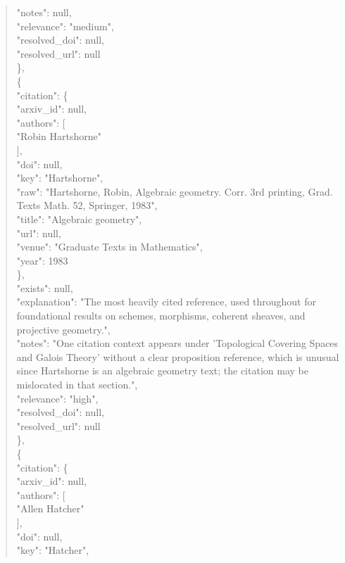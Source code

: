 \documentclass[11pt]{article}
\begin{document}
\begin{quote}
      "notes": null,\\
      "relevance": "medium",\\
      "resolved\_doi": null,\\
      "resolved\_url": null\\
    \},\\
    \{\\
      "citation": \{\\
        "arxiv\_id": null,\\
        "authors": [\\
          "Robin Hartshorne"\\
        ],\\
        "doi": null,\\
        "key": "Hartshorne",\\
        "raw": "Hartshorne, Robin, Algebraic geometry. Corr. 3rd printing, Grad. Texts Math. 52, Springer, 1983",\\
        "title": "Algebraic geometry",\\
        "url": null,\\
        "venue": "Graduate Texts in Mathematics",\\
        "year": 1983\\
      \},\\
      "exists": null,\\
      "explanation": "The most heavily cited reference, used throughout for foundational results on schemes, morphisms, coherent sheaves, and projective geometry.",\\
      "notes": "One citation context appears under 'Topological Covering Spaces and Galois Theory' without a clear proposition reference, which is unusual since Hartshorne is an algebraic geometry text; the citation may be mislocated in that section.",\\
      "relevance": "high",\\
      "resolved\_doi": null,\\
      "resolved\_url": null\\
    \},\\
    \{\\
      "citation": \{\\
        "arxiv\_id": null,\\
        "authors": [\\
          "Allen Hatcher"\\
        ],\\
        "doi": null,\\
        "key": "Hatcher",\\

\end{quote}
\end{document}
